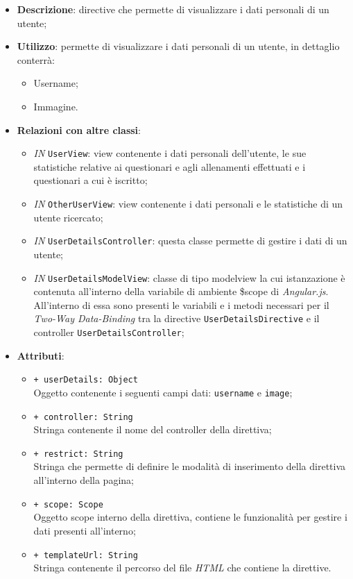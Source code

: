 \begin{itemize}
	\item \textbf{Descrizione}: directive che permette di visualizzare i dati personali di un utente;
	\item \textbf{Utilizzo}: permette di visualizzare i dati personali di un utente, in dettaglio conterrà:
	\begin{itemize}
		\item Username;
		\item Immagine.
	\end{itemize}
	\item \textbf{Relazioni con altre classi}:
	\begin{itemize}
		\item \textit{IN} \texttt{UserView}: view contenente i dati personali dell'utente, le sue statistiche relative ai questionari e agli allenamenti effettuati e i questionari a cui è iscritto;
		\item \textit{IN} \texttt{OtherUserView}: view contenente i dati personali e le statistiche di un utente ricercato;
		\item \textit{IN} \texttt{UserDetailsController}: questa classe permette di gestire i dati di un utente;
		\item \textit{IN} \texttt{UserDetailsModelView}: classe di tipo modelview la cui istanzazione è contenuta all'interno della variabile di ambiente \$scope di \textit{Angular.js}. All'interno di essa sono presenti le variabili e i metodi necessari per il \textit{Two-Way Data-Binding} tra la directive \texttt{UserDetailsDirective} e il controller \texttt{UserDetailsController};
	\end{itemize}
	\item \textbf{Attributi}:
	\begin{itemize}
		\item \texttt{+ userDetails: Object} \\ Oggetto contenente i seguenti campi dati: \texttt{username} e \texttt{image};
		\item \texttt{+ controller: String} \\ Stringa contenente il nome del controller della direttiva;
		\item \texttt{+ restrict: String} \\ Stringa che permette di definire le modalità di inserimento della direttiva all'interno della pagina;
		\item \texttt{+ scope: Scope} \\ Oggetto scope interno della direttiva, contiene le funzionalità per gestire i dati presenti all'interno;
		\item \texttt{+ templateUrl: String} \\ Stringa contenente il percorso del file \textit{HTML} che contiene la direttive.
	\end{itemize}
\end{itemize}